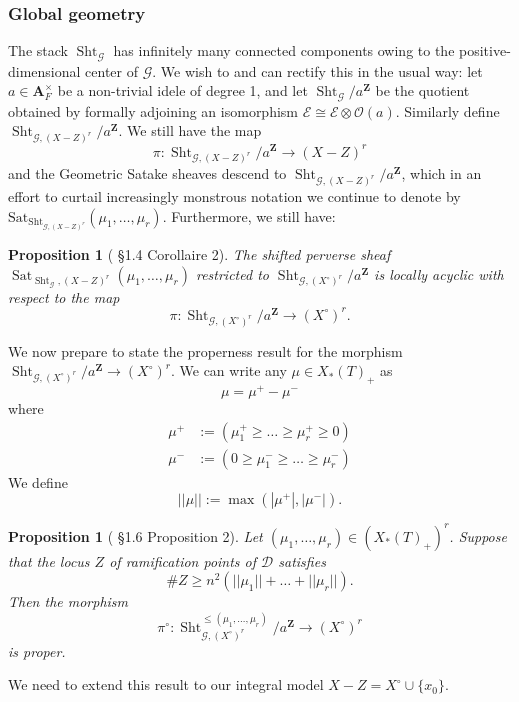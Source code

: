 \documentclass[reqno]{amsart}
\numberwithin{equation}{section}
\newcommand{\Z}{\mathbf{Z}}
\newcommand{\Cal}[1]{\mathcal{#1}}
\newcommand{\A}{\mathbf{A}}
\newcommand{\co}{\colon}
\newcommand{\mrm}[1]{\mathrm{#1}}
\newcommand{\cX}{X^{\circ}}
\DeclareMathOperator{\Sht}{Sht}
\DeclareMathOperator{\Sat}{Sat}
\newtheorem{prop}[thm]{Proposition}
\theoremstyle{remark}
\numberwithin{equation}{section}
\begin{document}
\subsubsection{Global geometry}

The stack $\Sht_{\Cal{G}}$ has infinitely many connected components owing to the positive-dimensional center of $\Cal{G}$. We wish to and can rectify this in the usual way: let $a \in \A_F^{\times}$ be a non-trivial idele of degree 1, and let $\Sht_{\Cal{G}}/a^{\Z}$ be the quotient obtained by formally adjoining an isomorphism $\Cal{E} \cong \Cal{E} \otimes \Cal{O}(a)$. Similarly define $\Sht_{\Cal{G},(X-Z)^r}/a^{\Z}$. We still have the map 
\[
\pi \co \Sht_{\Cal{G},(X-Z)^r}/a^{\Z} \rightarrow (X-Z)^r
\]
and the Geometric Satake sheaves descend to $\Sht_{\Cal{G},(X-Z)^r}/a^{\Z}$, which in an effort to curtail increasingly monstrous notation we continue to denote by $\mrm{Sat}_{\Sht_{\Cal{G},(X-Z)
^r}}(\mu_1, \ldots, \mu_r)$. Furthermore, we still have: 

\begin{prop}[\cite{Ngo06} \S 1.4 Corollaire 2]\label{ULA} The shifted perverse sheaf $\Sat_{\Sht_{\Cal{G}},(X-Z)^r}(\mu_1, \ldots, \mu_r)$ restricted to $\Sht_{\Cal{G},(\cX)^r}/a^{\Z}$ is locally acyclic with respect to the map 
\[
\pi \co \Sht_{\Cal{G},(\cX)^r}/a^{\Z} \rightarrow (\cX)^r.
\] 
\end{prop}


We now prepare to state the properness result for the morphism $\Sht_{\Cal{G},(\cX)^r}/a^{\Z} \rightarrow (\cX)^r$. We can write any $\mu \in X_*(T)_{+}$ as 
\[
\mu = \mu^+ - \mu^-
\]
where 
\begin{align*}
\mu^+ &:= (\mu_1^+ \geq \ldots \geq \mu_r^+ \geq 0) \\
\mu^- &:= (0 \geq \mu_1^- \geq \ldots \geq \mu_r^-)
\end{align*}
We define 
\[
||\mu|| := \max(|\mu^+|, |\mu^-|).
\] 





\begin{prop}[\cite{Ngo06} \S 1.6 Proposition 2]\label{proper}
Let $ (\mu_1, \ldots, \mu_r) \in (X_*(T)_+)^r$. Suppose that the locus $Z$ of ramification points of $\Cal{D}$ satisfies
\[
\# Z  \geq n^2 (||\mu_1|| + \ldots + || \mu_r||). 
\]
Then the morphism 
\[
\pi^{\circ} \co \Sht_{\Cal{G},(\cX)^r}^{\leq  (\mu_1, \ldots, \mu_r) }/a^{\Z} \rightarrow (\cX)^r
\]
is proper. 
\end{prop}

We need to extend this result to our integral model $X-Z = \cX \cup \{x_0\}$.  
\end{document}
